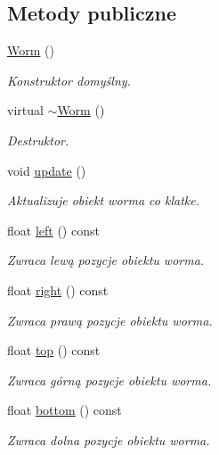 \subsection*{Metody publiczne}
\begin{DoxyCompactItemize}
\item 
\mbox{\hyperlink{class_worm_aaec23e2156f969303d6bfac36cae63e3}{Worm}} ()
\begin{DoxyCompactList}\small\item\em Konstruktor domyślny. \end{DoxyCompactList}\item 
virtual \mbox{\hyperlink{class_worm_ade7672966c551bb91663ed03e06f297f}{$\sim$\+Worm}} ()
\begin{DoxyCompactList}\small\item\em Destruktor. \end{DoxyCompactList}\item 
void \mbox{\hyperlink{class_worm_adcb6219ae98887e491327c4ef02cf4b9}{update}} ()
\begin{DoxyCompactList}\small\item\em Aktualizuje obiekt worma co klatke. \end{DoxyCompactList}\item 
float \mbox{\hyperlink{class_worm_ab517b492de0e583254c288cc583cbeb1}{left}} () const
\begin{DoxyCompactList}\small\item\em Zwraca lewą pozycje obiektu worma. \end{DoxyCompactList}\item 
float \mbox{\hyperlink{class_worm_a52905b36980b4aa37fe1b004df9edc0e}{right}} () const
\begin{DoxyCompactList}\small\item\em Zwraca prawą pozycje obiektu worma. \end{DoxyCompactList}\item 
float \mbox{\hyperlink{class_worm_a3d65c40350e8e0317bd594a3cb7c8bba}{top}} () const
\begin{DoxyCompactList}\small\item\em Zwraca górną pozycje obiektu worma. \end{DoxyCompactList}\item 
float \mbox{\hyperlink{class_worm_a68061fb5be175ab42739a7c157d7073d}{bottom}} () const
\begin{DoxyCompactList}\small\item\em Zwraca dolna pozycje obiektu worma. \end{DoxyCompactList}\item 

\end{DoxyCompactItemize}
